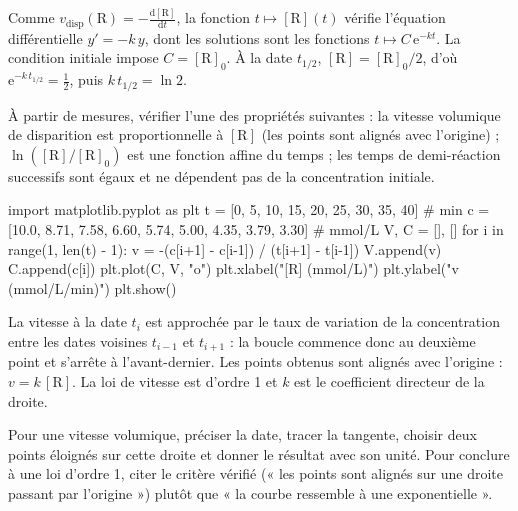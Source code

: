 \begin{demonstration}
Comme $v_\mathrm{disp}(\mathrm{R})=-\frac{\mathrm{d}[\mathrm{R}]}{\mathrm{d}t}$, la fonction $t\mapsto[\mathrm{R}](t)$
vérifie l'équation différentielle $y'=-k\,y$, dont les solutions sont les fonctions $t\mapsto C\,\mathrm{e}^{-kt}$.
La condition initiale impose $C=[\mathrm{R}]_0$. À la date $t_{1/2}$, $[\mathrm{R}]=[\mathrm{R}]_0/2$, d'où
$\mathrm{e}^{-k\,t_{1/2}}=\frac12$, puis $k\,t_{1/2}=\ln2$.
\end{demonstration}
\begin{savoirfaire}
À partir de mesures, vérifier l'une des propriétés suivantes : la vitesse volumique de disparition est proportionnelle
à $[\mathrm{R}]$ (les points sont alignés avec l'origine) ; $\ln([\mathrm{R}]/[\mathrm{R}]_0)$ est une fonction
affine du temps ; les temps de demi-réaction successifs sont égaux et ne dépendent pas de la concentration initiale.
\end{savoirfaire}
\begin{codecote}[0.58]
\begin{pythoncol}
import matplotlib.pyplot as plt
t = [0, 5, 10, 15, 20, 25, 30, 35, 40]  # min
c = [10.0, 8.71, 7.58, 6.60, 5.74,
     5.00, 4.35, 3.79, 3.30]  # mmol/L
V, C = [], []
for i in range(1, len(t) - 1):
    v = -(c[i+1] - c[i-1]) / (t[i+1] - t[i-1])
    V.append(v)
    C.append(c[i])
plt.plot(C, V, "o")
plt.xlabel("[R] (mmol/L)")
plt.ylabel("v (mmol/L/min)")
plt.show()
\end{pythoncol}
\cote
\fontsize{9.5}{12.5}\selectfont
{}\par\smallskip
La vitesse à la date $t_i$ est approchée par le taux de variation de la concentration entre les dates voisines
$t_{i-1}$ et $t_{i+1}$ : la boucle commence donc au deuxième point et s'arrête à l'avant-dernier.
Les points obtenus sont alignés avec l'origine : $v=k\,[\mathrm{R}]$. La loi de vitesse est d'ordre 1 et $k$ est le
coefficient directeur de la droite.
\end{codecote}
\begin{rediger}
Pour une vitesse volumique, préciser la date, tracer la tangente, choisir deux points éloignés sur cette droite et
donner le résultat avec son unité. Pour conclure à une loi d'ordre 1, citer le critère vérifié (« les points sont
alignés sur une droite passant par l'origine ») plutôt que « la courbe ressemble à une exponentielle ».
\end{rediger}
\exercices

